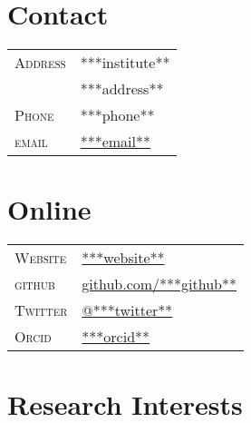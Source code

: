 \documentclass[10pt]{article}
\begin{document}

\par{\bigskip\par}

\begin{multicols}{2}
\setlength{\parskip}{0pt}

\section{Contact}
\begin{tabularx}{\linewidth}{@{}l X@{}}
  \textsc{Address} & \small{***institute**} \\
                   & \small{***address**} \\
  \textsc{Phone}   & \small{***phone**}\\
  \textsc{email}   & \href{mailto:***email**}{***email**} \\
\end{tabularx}

\columnbreak

\section{Online}
\begin{tabularx}{\linewidth}{@{}l X@{}}
  \textsc{Website}  & \href{***websiteescaped**}{***website**} \\
  \textsc{github}   & \href{http://www.github.com/***github**}{github.com/***github**}\\
  \textsc{Twitter}  & \href{https://twitter.com/***twitter**}{@***twitter**} \\
  \textsc{Orcid}    & \href{http://orcid.org/***orcid**}{***orcid**} \\
\end{tabularx}

\end{multicols}


\ifinterests

  \section{Research Interests}
\end{document}

